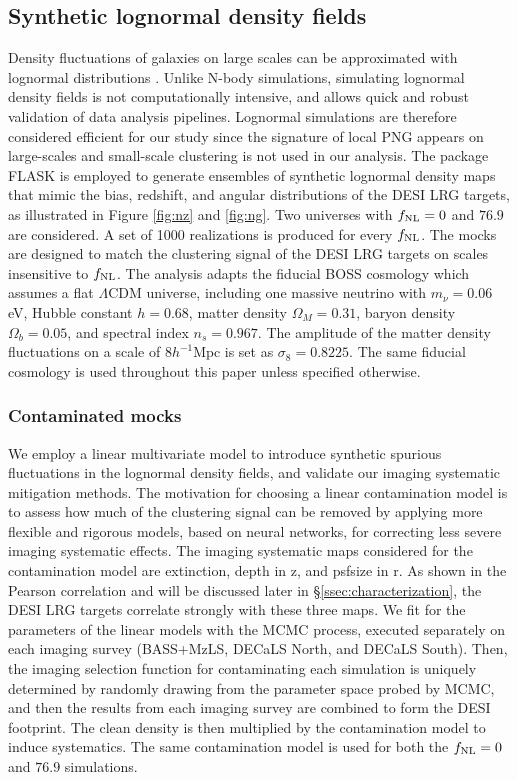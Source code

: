 \subsection{Synthetic lognormal density fields}\label{ssec:mocks}
Density fluctuations of galaxies on large scales can be approximated with lognormal distributions \citep{coles1991, 2017MNRAS.466.1444C}. Unlike N-body simulations, simulating lognormal density fields is not computationally intensive, and allows quick and robust validation of data analysis pipelines. Lognormal simulations are therefore considered efficient for our study since the signature of local PNG appears on large-scales and small-scale clustering is not used in our analysis. The package \textsc{FLASK} \citep[Full-sky Lognormal Astro-fields Simulation Kit;][]{Xavier_2016} is employed to generate ensembles of synthetic lognormal density maps that mimic the bias, redshift, and angular distributions of the DESI LRG targets, as illustrated in Figure \ref{fig:nz} and \ref{fig:ng}. Two universes with $f_{\rm NL}=0$ and $76.9$ are considered. A set of 1000 realizations is produced for every $f_{\rm NL}$. The mocks are designed to match the clustering signal of the DESI LRG targets on scales insensitive to $f_{\rm NL}$. The analysis adapts the fiducial BOSS cosmology \citep{2017MNRAS.470.2617A} which assumes a flat $\Lambda$CDM universe, including one massive neutrino with $m_{\nu}=0.06$ eV, Hubble constant $h = 0.68$, matter density $\Omega_{M}=0.31$, baryon density $\Omega_{b}=0.05$, and spectral index $n_{s}=0.967$. The amplitude of the matter density fluctuations on a scale of $8 h^{-1} \text{Mpc}$ is set as $\sigma_{8}=0.8225$. The same fiducial cosmology is used throughout this paper unless specified otherwise. %

\subsubsection{Contaminated mocks}
We employ a linear multivariate model to introduce synthetic spurious fluctuations in the lognormal density fields, and validate our imaging systematic mitigation methods. The motivation for choosing a linear contamination model is to assess how much of the clustering signal can be removed by applying more flexible and rigorous models, based on neural networks, for correcting less severe imaging systematic effects. The imaging systematic maps considered for the contamination model are extinction, depth in z, and psfsize in r. As shown in the Pearson correlation and will be discussed later in \S \ref{ssec:characterization}, the DESI LRG targets correlate strongly with these three maps. We fit for the parameters of the linear models with the MCMC process, executed separately on each imaging survey (BASS+MzLS, DECaLS North, and DECaLS South). Then, the imaging selection function for contaminating each simulation is uniquely determined by randomly drawing from the parameter space probed by MCMC, and then the results from each imaging survey are combined to form the DESI footprint. The clean density is then multiplied by the contamination model to induce systematics.  The same contamination model is used for both the $f_{\rm NL}=0$ and $76.9$ simulations.

